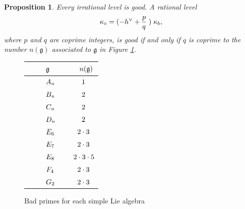 \documentclass[11pt,reqno]{amsart}
\newcommand{\fg}{\mathfrak{g}}
\newtheorem{pro}[subsubsection]{Proposition}
\theoremstyle{remark}
\numberwithin{equation}{section}
\begin{document}
\begin{pro}\label{p:adapt} Every irrational level is good. A rational level
	\[ \kappa_\circ = (-h^\vee + 
	\frac{p}{q}\hspace{1mm})\hspace{1mm}\kappa_b, 
	\]
	where $p$ and $q$ are coprime integers, is good if and only if $q$ is 
	coprime to the number $n(\fg)$ associated to 
	$\fg$ in Figure \ref{f:badprimes}. 
\end{pro}
\begin{center}
	\begin{figure}
		
		
		
		
		\begin{tabular}{ |m{2cm}  | m{2cm} | } 
			
			\hline
			\vspace{2mm}
			$\hspace{.9cm} \fg$ \vspace{2mm} & \vspace{2mm} 
			$\hspace{.8cm}n(\fg)$\vspace{2mm} 
			\\ 
			\hline
			
			\vspace{2mm} $\hspace{.9cm}A_n$ 	& \vspace{2mm} 
			$\hspace{.9cm}1$  
			\\[2mm] 
			$\hspace{.9cm}B_n$ 	& $\hspace{.9cm}2$  \\[2mm] 
			$\hspace{.9cm}C_n $	& $\hspace{.9cm}2$  \\[2mm] 
			$\hspace{.9cm}D_n $	& $\hspace{.9cm}2$ \\[2mm] 
			$\hspace{.9cm}E_6 $	& $\hspace{.7cm}2 \cdot 3$ \\[2mm]
			$\hspace{.9cm}E_7 $	& $\hspace{.7cm}2 \cdot 3$ \\[2mm]
			$\hspace{.9cm}E_8$  & $\hspace{.5cm}2 \cdot 3 \cdot 5$ \\[2mm]
			$\hspace{.9cm}F_4$ 	& $\hspace{.7cm}2 \cdot 3$ \\[2mm] 
			$\hspace{.9cm}G_2 $	& $\hspace{.7cm}2 \cdot 3 $\\[2mm]
			\hline
			
		\end{tabular}
		\caption{Bad primes for each simple Lie algebra}
		
		\label{f:badprimes}
	\end{figure}
\end{center}
\end{document}
